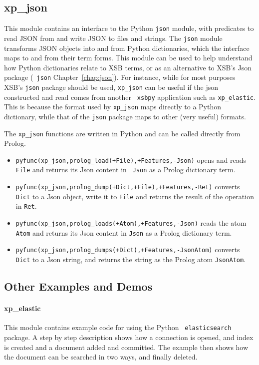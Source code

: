 \subsection{xp\_json}
This module contains an interface to the Python {\tt json} module,
with predicates to read JSON from and write JSON to files and strings.
The {\tt json} module transforms JSON objects into and from Python
dictionaries, which the interface maps to and from their term forms.
This module can be used to help understand how Python dictionaries
relate to XSB terms, or as an alternative to XSB's Json package ({\tt
  json} Chapter~\ref{chap:json}).  For instance, while for most
purposes XSB's {\tt json} package should be used, {\tt xp\_json} can
be useful if the json constructed and read comes from another {\tt
  xsbpy} application such as {\tt xp\_elastic}.  This is because the
format used by {\tt xp\_json} maps directly to a Python dictionary,
while that of the {\tt json} package maps to other (very useful)
formats.

The {\tt xp\_json} functions are written in Python and can be
called directly from Prolog.
\begin{itemize}
\item {\tt pyfunc(xp\_json,prolog\_load(+File),+Features,-Json)}
  opens and reads {\tt File} and returns its Json content in {\tt
    Json} as a Prolog dictionary term.
\item {\tt pyfunc(xp\_json,prolog\_dump(+Dict,+File),+Features,-Ret)}
  converts {\tt Dict} to a Json object, write it to {\tt File} and
  returns the result of the operation in {\tt Ret}.
\item {\tt pyfunc(xp\_json,prolog\_loads(+Atom),+Features,-Json)}
  reads the atom {\tt Atom} and returns its Json content in {\tt Json}
  as a Prolog dictionary term.
\item {\tt  pyfunc(xp\_json,prolog\_dumps(+Dict),+Features,-JsonAtom)}
  converts {\tt Dict} to a Json string, and returns the string as the
  Prolog atom {\tt JsonAtom}.
\end{itemize}  

\subsection{Other Examples and Demos}

\paragraph{xp\_elastic}
This module contains example code for using the Python {\tt
  elasticsearch} package.  A step by step description shows how a
connection is opened, and index is created and a document added and
committed.  The example then shows how the document can be searched in
two ways, and finally deleted.

